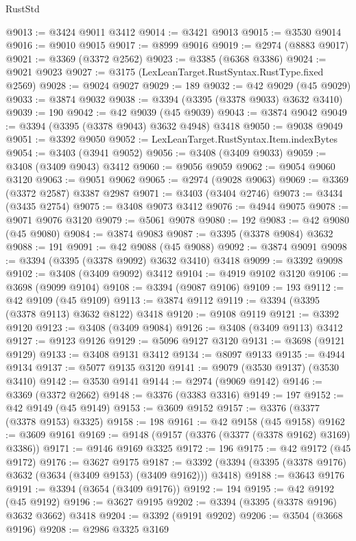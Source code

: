 \begin{lexlean}{RustStd}
\begin{coremodule}
@9013 := @3424 @9011 @3412
@9014 := @3421 @9013
@9015 := @3530 @9014
@9016 := @9010 @9015
@9017 := @8999 @9016
@9019 := @2974 (@8883 @9017)
@9021 := @3369 (@3372 @2562)
@9023 := @3385 (@6368 @3386)
@9024 := @9021 @9023
@9027 := @3175 (LexLeanTarget.RustSyntax.RustType.fixed @2569)
@9028 := @9024 @9027
@9029 := 189
@9032 := @42 @9029 (@45 @9029)
@9033 := @3874 @9032
@9038 := @3394 (@3395 (@3378 @9033) @3632 @3410)
@9039 := 190
@9042 := @42 @9039 (@45 @9039)
@9043 := @3874 @9042
@9049 := @3394 (@3395 (@3378 @9043) @3632 @4948) @3418
@9050 := @9038 @9049
@9051 := @3392 @9050
@9052 := LexLeanTarget.RustSyntax.Item.indexBytes
@9054 := @3403 (@3941 @9052)
@9056 := @3408 (@3409 @9033)
@9059 := @3408 (@3409 @9043) @3412
@9060 := @9056 @9059
@9062 := @9054 @9060 @3120
@9063 := @9051 @9062
@9065 := @2974 (@9028 @9063)
@9069 := @3369 (@3372 @2587) @3387 @2987
@9071 := @3403 (@3404 @2746)
@9073 := @3434 (@3435 @2754)
@9075 := @3408 @9073 @3412
@9076 := @4944 @9075
@9078 := @9071 @9076 @3120
@9079 := @5061 @9078
@9080 := 192
@9083 := @42 @9080 (@45 @9080)
@9084 := @3874 @9083
@9087 := @3395 (@3378 @9084) @3632
@9088 := 191
@9091 := @42 @9088 (@45 @9088)
@9092 := @3874 @9091
@9098 := @3394 (@3395 (@3378 @9092) @3632 @3410) @3418
@9099 := @3392 @9098
@9102 := @3408 (@3409 @9092) @3412
@9104 := @4919 @9102 @3120
@9106 := @3698 (@9099 @9104)
@9108 := @3394 (@9087 @9106)
@9109 := 193
@9112 := @42 @9109 (@45 @9109)
@9113 := @3874 @9112
@9119 := @3394 (@3395 (@3378 @9113) @3632 @8122) @3418
@9120 := @9108 @9119
@9121 := @3392 @9120
@9123 := @3408 (@3409 @9084)
@9126 := @3408 (@3409 @9113) @3412
@9127 := @9123 @9126
@9129 := @5096 @9127 @3120
@9131 := @3698 (@9121 @9129)
@9133 := @3408 @9131 @3412
@9134 := @8097 @9133
@9135 := @4944 @9134
@9137 := @5077 @9135 @3120
@9141 := @9079 (@3530 @9137) (@3530 @3410)
@9142 := @3530 @9141
@9144 := @2974 (@9069 @9142)
@9146 := @3369 (@3372 @2662)
@9148 := @3376 (@3383 @3316)
@9149 := 197
@9152 := @42 @9149 (@45 @9149)
@9153 := @3609 @9152
@9157 := @3376 (@3377 (@3378 @9153) @3325)
@9158 := 198
@9161 := @42 @9158 (@45 @9158)
@9162 := @3609 @9161
@9169 := @9148 (@9157 (@3376 (@3377 (@3378 @9162) @3169) @3386))
@9171 := @9146 @9169 @3325
@9172 := 196
@9175 := @42 @9172 (@45 @9172)
@9176 := @3627 @9175
@9187 := @3392 (@3394 (@3395 (@3378 @9176) @3632 (@3634 (@3409 @9153) (@3409 @9162))) @3418)
@9188 := @3643 @9176
@9191 := @3394 (@3654 (@3409 @9176))
@9192 := 194
@9195 := @42 @9192 (@45 @9192)
@9196 := @3627 @9195
@9202 := @3394 (@3395 (@3378 @9196) @3632 @3662) @3418
@9204 := @3392 (@9191 @9202)
@9206 := @3504 (@3668 @9196)
@9208 := @2986 @3325 @3169

\end{coremodule}
\end{lexlean}
